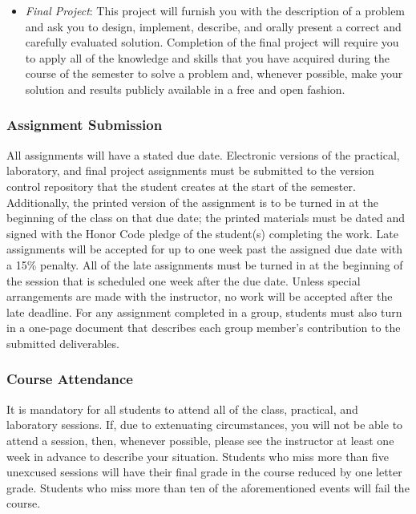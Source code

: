 \begin{itemize}
  \item {\em Final Project}: This project will furnish you with the description of a problem and ask you to design,
    implement, describe, and orally present a correct and carefully evaluated solution. Completion of the final project
    will require you to apply all of the knowledge and skills that you have acquired during the course of the semester
    to solve a problem and, whenever possible, make your solution and results publicly available in a free and open
    fashion.

\end{itemize}

\subsubsection*{Assignment Submission}

All assignments will have a stated due date. Electronic versions of the practical, laboratory, and final project
assignments must be submitted to the version control repository that the student creates at the start of the semester.
Additionally, the printed version of the assignment is to be turned in at the beginning of the class on that due date;
the printed materials must be dated and signed with the Honor Code pledge of the student(s) completing the work.  Late
assignments will be accepted for up to one week past the assigned due date with a 15\% penalty. All of the late
assignments must be turned in at the beginning of the session that is scheduled one week after the due date. Unless
special arrangements are made with the instructor, no work will be accepted after the late deadline. For any
assignment completed in a group, students must also turn in a one-page document that describes each group member's
contribution to the submitted deliverables.

\subsubsection*{Course Attendance}

It is mandatory for all students to attend all of the class, practical, and laboratory sessions. If, due to extenuating
circumstances, you will not be able to attend a session, then, whenever possible, please see the instructor at least one
week in advance to describe your situation.  Students who miss more than five unexcused sessions will have their final
grade in the course reduced by one letter grade. Students who miss more than ten of the aforementioned events will fail
the course.

